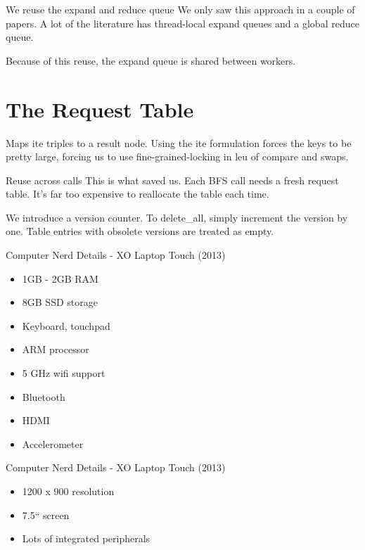 \documentclass{beamer}
\begin{document}
\begin{frame}{We reuse the expand and reduce queue}
We only saw this approach in a couple of papers. A lot of the literature has thread-local expand queues and a global reduce queue.

Because of this reuse, the expand queue is shared between workers.
\end{frame}

\section{The Request Table}

\begin{frame}
Maps ite triples to a result node. Using the ite formulation forces the keys to be pretty large, forcing us to use fine-grained-locking in leu of compare and swaps.
\end{frame}

\begin{frame}{Reuse across calls}
This is what saved us. Each BFS call needs a fresh request table. It's far too expensive to reallocate the table each time.

We introduce a version counter. To delete_all, simply increment the version by one. Table entries with obsolete versions are treated as empty.
\end{frame}

\begin{frame}{Computer Nerd Details - XO Laptop Touch (2013)\cite{faq}}
\begin{itemize}
\item 1GB - 2GB RAM
\item 8GB SSD storage
\item Keyboard, touchpad
\item ARM processor
\item 5 GHz wifi support
\item Bluetooth
\item HDMI
\item Accelerometer
\end{itemize}
\end{frame}

\begin{frame}{Computer Nerd Details - XO Laptop Touch (2013)}
\begin{itemize}
\item 1200 x 900 resolution
\item 7.5`` screen
\item Lots of integrated peripherals
\end{itemize}
\end{frame}
\end{document}
